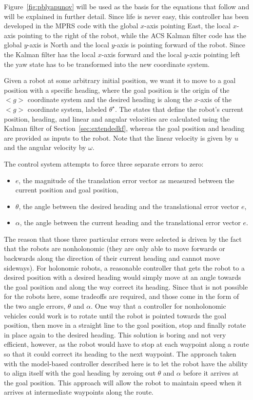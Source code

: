Figure~\ref{fig:pblyapunov} will be used as the basis for the equations that follow and will be explained in further detail. Since life is never easy, this controller has been developed in the MPRS code with the global $x$-axis pointing East, the local $x$-axis pointing to the right of the robot, while the ACS Kalman filter code has the global $y$-axis is North and the local $y$-axis is pointing forward of the robot. Since the Kalman filter has the local $x$-axis forward and the local $y$-axis pointing left the yaw state has to be transformed into the new coordinate system.

Given a robot at some arbitrary initial position, we want it to move to a goal position with a specific heading, where the goal position is the origin of the $<g>$ coordinate system and the desired heading is along the $x$-axis of the $<g>$ coordinate system, labeled $\theta^\star$. The states that define the robot's current position, heading, and linear and angular velocities are calculated using the Kalman filter of Section~\ref{sec:extendedkf}, whereas the goal position and heading are provided as inputs to the robot. Note that the linear velocity is given by $u$ and the angular velocity by $\omega$.

The control system attempts to force three separate errors to zero:
\begin{itemize}
\item $e$, the magnitude of the translation error vector as measured between the current position and goal position,
\item $\theta$, the angle between the desired heading and the translational error vector $e$,
\item $\alpha$, the angle between the current heading and the translational error vector $e$.
\end{itemize}

The reason that those three particular errors were selected is driven by the fact that the robots are nonholonomic (they are only able to move forwards or backwards along the direction of their current heading and cannot move sideways). For holonomic robots, a reasonable controller that gets the robot to a desired position with a desired heading would simply move at an angle towards the goal position and along the way correct its heading. Since that is not possible for the robots here, some tradeoffs are required, and those come in the form of the two angle errors, $\theta$ and $\alpha$. One way that a controller for nonholonomic vehicles could work is to rotate until the robot is pointed towards the goal position, then move in a straight line to the goal position, stop and finally rotate in place again to the desired heading. This solution is boring and not very efficient, however, as the robot would have to stop at each waypoint along a route so that it could correct its heading to the next waypoint. The approach taken with the model-based controller described here is to let the robot have the ability to align itself with the goal heading by zeroing out $\theta$ and $\alpha$ before it arrives at the goal position. This approach will allow the robot to maintain speed when it arrives at intermediate waypoints along the route.

